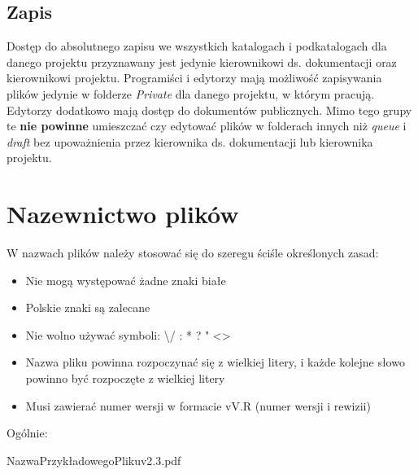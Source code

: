 \documentclass{article}
\begin{document}
\subsection{Zapis}
Dostęp do absolutnego zapisu we wszystkich katalogach i podkatalogach dla danego projektu
przyznawany jest jedynie kierownikowi ds. dokumentacji oraz kierownikowi projektu.
Programiści i edytorzy mają możliwość zapisywania plików jedynie w folderze \textit{Private} dla danego
projektu, w którym pracują. Edytorzy dodatkowo mają dostęp do dokumentów publicznych. Mimo tego grupy te \textbf{nie powinne} umieszczać
czy edytować plików w folderach innych niż \textit{queue} i \textit{draft} bez upoważnienia przez
kierownika ds. dokumentacji lub kierownika projektu.

\section{Nazewnictwo plików}
W nazwach plików należy stosować się do szeregu ściśle określonych zasad:
\begin{itemize}
    \item Nie mogą występować żadne znaki białe
    \item Polskie znaki są zalecane
    \item Nie wolno używać symboli: \textbackslash / : * ? " \textless \textgreater
    \item Nazwa pliku powinna rozpoczynać się z wielkiej litery, i każde kolejne słowo powinno być rozpoczęte z wielkiej litery
    \item Musi zawierać numer wersji w formacie vV.R (numer wersji i rewizii)
\end{itemize}
Ogólnie:
\begin{center}
    NazwaPrzykładowegoPlikuv2.3.pdf
\end{center}
\end{document}

